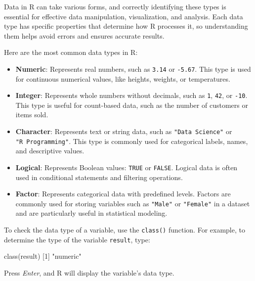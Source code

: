 \documentclass[
  11pt,
]{book}
\makeatletter
\newenvironment{Shaded}{}{}
\newcommand{\DecValTok}[1]{#1}
\newcommand{\FunctionTok}[1]{#1}
\newcommand{\NormalTok}[1]{#1}
\newcommand{\StringTok}[1]{\textcolor[rgb]{0.39,0.39,0.39}{#1}}
\providecommand{\tightlist}{%
  \setlength{\itemsep}{0pt}\setlength{\parskip}{0pt}}
\newenvironment{kframe}{%
\medskip{}
\setlength{\fboxsep}{.8em}
 \def\at@end@of@kframe{}%
 \ifinner\ifhmode%
  \def\at@end@of@kframe{\end{minipage}}%
  \begin{minipage}{\columnwidth}%
 \fi\fi%
 \def\FrameCommand##1{\hskip\@totalleftmargin \hskip-\fboxsep
 \colorbox{shadecolor}{##1}\hskip-\fboxsep
     \hskip-\linewidth \hskip-\@totalleftmargin \hskip\columnwidth}%
 \MakeFramed {\advance\hsize-\width
   \@totalleftmargin\z@ \linewidth\hsize
   \@setminipage}}%
 {\par\unskip\endMakeFramed%
 \at@end@of@kframe}
\renewenvironment{Shaded}{\begin{kframe}}{\end{kframe}}
\theoremstyle{definition}
\theoremstyle{definition}
\theoremstyle{definition}
\theoremstyle{definition}
\theoremstyle{remark}
\makeatother
\begin{document}
Data in R can take various forms, and correctly identifying these types is essential for effective data manipulation, visualization, and analysis. Each data type has specific properties that determine how R processes it, so understanding them helps avoid errors and ensures accurate results.

Here are the most common data types in R:

\begin{itemize}
\tightlist
\item
  \textbf{Numeric}: Represents real numbers, such as \texttt{3.14} or \texttt{-5.67}. This type is used for continuous numerical values, like heights, weights, or temperatures.\\
\item
  \textbf{Integer}: Represents whole numbers without decimals, such as \texttt{1}, \texttt{42}, or \texttt{-10}. This type is useful for count-based data, such as the number of customers or items sold.\\
\item
  \textbf{Character}: Represents text or string data, such as \texttt{"Data\ Science"} or \texttt{"R\ Programming"}. This type is commonly used for categorical labels, names, and descriptive values.\\
\item
  \textbf{Logical}: Represents Boolean values: \texttt{TRUE} or \texttt{FALSE}. Logical data is often used in conditional statements and filtering operations.\\
\item
  \textbf{Factor}: Represents categorical data with predefined levels. Factors are commonly used for storing variables such as \texttt{"Male"} or \texttt{"Female"} in a dataset and are particularly useful in statistical modeling.
\end{itemize}

To check the data type of a variable, use the \texttt{class()} function. For example, to determine the type of the variable \texttt{result}, type:

\begin{Shaded}
\begin{Highlighting}[]
\FunctionTok{class}\NormalTok{(result)}
\NormalTok{   [}\DecValTok{1}\NormalTok{] }\StringTok{"numeric"}
\end{Highlighting}
\end{Shaded}

Press \emph{Enter}, and R will display the variable's data type.
\end{document}
